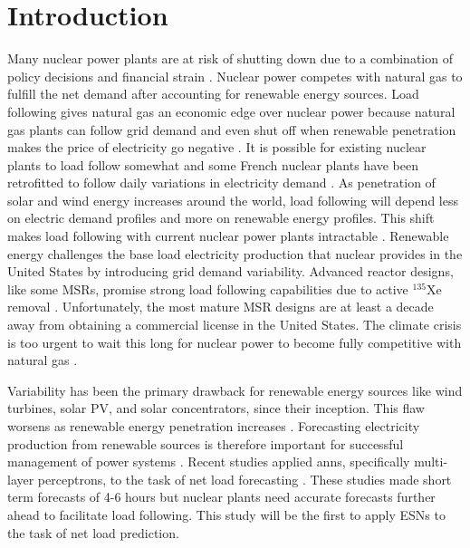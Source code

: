\section{Introduction}

Many nuclear power plants are at risk of shutting down due to a combination of
policy decisions and financial strain \cite{clemmer_nuclear_2018}. Nuclear
power competes with natural gas to fulfill the net demand after accounting for
renewable energy sources. Load following gives natural
gas an economic edge over nuclear power because natural gas plants can follow
grid demand and even shut off when renewable penetration makes the
price of electricity go negative \cite{keppler_carbon_2011}. It is possible for
existing nuclear plants to load follow somewhat and some French nuclear
plants have been retrofitted to follow daily variations in electricity demand
\cite{lokhov_technical_2011}. As penetration of solar
and wind energy increases around the world, load following will depend less on
electric demand profiles and more on renewable energy profiles. This shift makes
load following with current nuclear power plants intractable
\cite{cany_nuclear_2018}.
Renewable energy challenges the base load electricity production that
nuclear provides in the United States by introducing grid demand variability.
Advanced reactor designs, like some \glspl{MSR}, promise strong load following
capabilities due to active $^{135}$Xe removal \cite{rykhlevskii_impact_2019}.
Unfortunately, the most mature MSR
designs are at least a decade away from obtaining a commercial license in the
United States. The climate crisis is too urgent to wait this long for nuclear
power to become fully competitive with natural gas
\cite{intergovernmental_panel_on_climate_change_climate_2014}.

Variability has been the primary drawback for renewable energy sources like
wind turbines, solar PV, and solar concentrators, since their inception. This
flaw worsens as renewable energy penetration increases
\cite{cany_nuclear_2018}. Forecasting electricity production from
renewable sources is therefore important for successful management of power
systems \cite{kobylinski_high-resolution_2020}. Recent studies applied
\glspl{ann}, specifically multi-layer perceptrons, to the task of net load
forecasting \cite{kobylinski_high-resolution_2020,dutta_load_2017,lee_development_2016}.
These studies made short term forecasts of 4-6 hours but nuclear plants
need accurate forecasts further ahead to facilitate load following.
This study will be the first to apply \glspl{ESN} to the task of net load
prediction.
